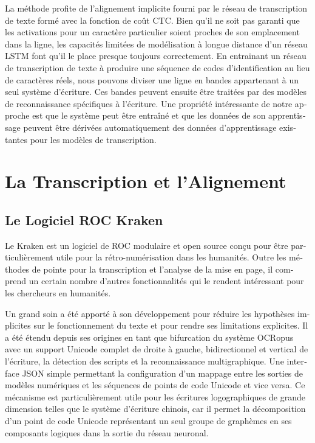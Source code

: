 \begin{french}
La méthode profite de l'alignement implicite fourni par le réseau de
transcription de texte formé avec la fonction de coût CTC.  Bien qu'il ne soit
pas garanti que les activations pour un caractère particulier soient proches de
son emplacement dans la ligne, les capacités limitées de modélisation à longue
distance d'un réseau LSTM font qu'il le place presque toujours correctement.
En entrainant un réseau de transcription de texte à produire une séquence de
codes d'identification au lieu de caractères réels, nous pouvons diviser une
ligne en bandes appartenant à un seul système d'écriture. Ces bandes peuvent
ensuite être traitées par des modèles de reconnaissance spécifiques à
l'écriture. Une propriété intéressante de notre approche est que le système
peut être entraîné et que les données de son apprentissage peuvent être
dérivées automatiquement des données d'apprentissage existantes pour les
modèles de transcription.

\section{La Transcription et l'Alignement}

\subsection{Le Logiciel ROC Kraken}

Le Kraken est un logiciel de ROC modulaire et open source conçu pour être
particulièrement utile pour la rétro-numérisation dans les humanités.
Outre les méthodes de pointe pour la transcription et l'analyse de la mise en
page, il comprend un certain nombre d'autres fonctionnalités qui le rendent
intéressant pour les chercheurs en humanités.

Un grand soin a été apporté à son développement pour réduire les hypothèses
implicites sur le fonctionnement du texte et pour rendre ses limitations
explicites. Il a été étendu depuis ses origines en tant que bifurcation du
système OCRopus avec un support Unicode complet de droite à gauche,
bidirectionnel et vertical de l'écriture, la détection des scripts et la
reconnaissance multigraphique. Une interface JSON simple permettant la
configuration d'un mappage entre les sorties de modèles numériques et les
séquences de points de code Unicode et vice versa. Ce mécanisme est
particulièrement utile pour les écritures logographiques de grande dimension
telles que le système d'écriture chinois, car il permet la décomposition d'un
point de code Unicode représentant un seul groupe de graphèmes en ses
composants logiques dans la sortie du réseau neuronal.


\end{french}

